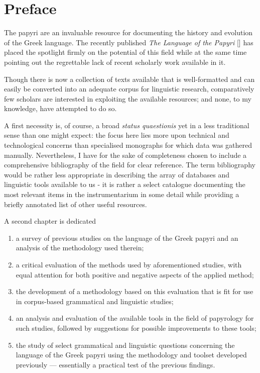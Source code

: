 \chapter{Preface}
\label{chap:preface}
\mtcaddchapter

The papyri are an invaluable resource for documenting the history and 
evolution of the Greek language. The recently published \emph{The 
Language of the Papyri} [\cite{lpapyri}] has placed the 
spotlight firmly on the potential of this field while at the 
same time pointing out the regrettable lack of recent scholarly 
work available in it.

Though there is now a collection of texts available that is 
well-formatted and can easily be converted into an adequate 
corpus for linguistic research, comparatively few scholars are 
interested in exploiting the available resources; and none, to 
my knowledge, have attempted to do so.


A first necessity is, of course, a broad \emph{status quaestionis} yet 
in a less traditional sense than one might expect: the focus here lies 
more upon technical and technological concerns than specialised 
monographs for which data was gathered manually. Nevertheless, I have 
for the sake of completeness chosen to include a comprehensive 
bibliography of the field for clear reference. The term bibliography 
would be rather less appropriate in describing the array of databases 
and linguistic tools available to us - it is rather a select catalogue 
documenting the most relevant items in the instrumentarium in some 
detail while providing a briefly annotated list of other useful 
resources.

A second chapter is dedicated

\begin{enumerate}
\item a survey of previous studies on the language of the Greek papyri 
and an analysis of the methodology used therein;
\item a critical evaluation of the methods used by aforementioned 
studies, with equal attention for both positive and negative aspects of 
the applied method;
\item the development of a methodology based on this evaluation that is 
fit for use in corpus-based grammatical and linguistic studies;
\item an analysis and evaluation of the available tools in the field of 
papyrology for such studies, followed by suggestions for possible 
improvements to these tools;
\item the study of select grammatical and linguistic questions 
concerning the language of the Greek papyri using the methodology and 
toolset developed previously — essentially a practical test of the 
previous findings.
\end{enumerate}

